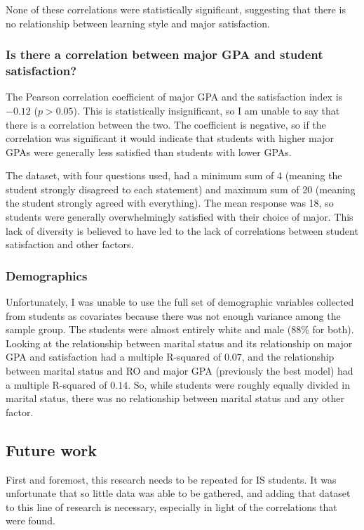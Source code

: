 None of these correlations were statistically significant, suggesting that there is no relationship between learning style and major satisfaction.

\subsubsection{Is there a correlation between major GPA and student satisfaction?}
The Pearson correlation coefficient of major GPA and the satisfaction index is $-0.12$ ($p>0.05$). This is statistically insignificant, so I am unable to say that there is a correlation between the two. The coefficient is negative, so if the correlation was significant it would indicate that students with higher major GPAs were generally less satisfied than students with lower GPAs.

The dataset, with four questions used, had a minimum sum of 4 (meaning the student strongly disagreed to each statement) and maximum sum of 20 (meaning the student strongly agreed with everything). The mean response was 18, so students were generally overwhelmingly satisfied with their choice of major. This lack of diversity is believed to have led to the lack of correlations between student satisfaction and other factors.

\subsubsection{Demographics}
Unfortunately, I was unable to use the full set of demographic variables collected from students as covariates because there was not enough variance among the sample group. The students were almost entirely white and male (88\% for both). Looking at the relationship between marital status and its relationship on major GPA and satisfaction had a multiple R-squared of $0.07$, and the relationship between marital status and RO and major GPA (previously the best model) had a multiple R-squared of $0.14$. So, while students were roughly equally divided in marital status, there was no relationship between marital status and any other factor.

\subsection{Future work}
First and foremost, this research needs to be repeated for IS students. It was unfortunate that so little data was able to be gathered, and adding that dataset to this line of research is necessary, especially in light of the correlations that were found.

